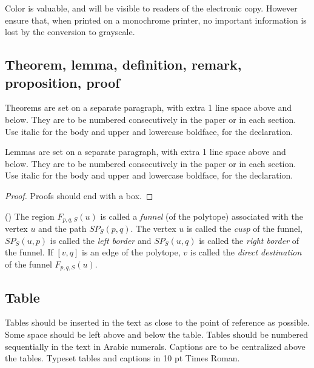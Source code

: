Color is valuable, and will be visible to readers of the electronic copy.
However ensure that, when printed on a monochrome printer, no important
information is lost by the conversion to grayscale.

\subsection{Theorem, lemma, definition, remark, proposition, proof}
\begin{theorem}
    Theorems are set on a separate paragraph, with extra 1 line space above and below. They are to be numbered consecutively in the paper or in each section. Use italic for the body and upper and lowercase boldface, for the declaration.
\end{theorem}
\begin{lemma}
    Lemmas are set on a separate paragraph, with extra 1 line space above and below. They are to be numbered consecutively in the paper or in each section. Use italic for the body and upper and lowercase boldface, for the declaration.
\end{lemma}
\begin{proof}
    Proofs should end with a box.
    \end{proof}

\begin{definition}\rm(\cite{b3})
    The region \(F_{p,q,S}(u)\) is called a \textit{funnel} (of the polytope) associated with the vertex \(u\) and the path \(SP_S(p, q)\). The vertex \(u\) is called the \textit{cusp} of the funnel, \(SP_S(u, p)\) is called the \textit{left border} and \(SP_S(u, q)\) is called the \textit{right border} of the funnel. If \([v, q]\) is an edge of the polytope, \(v\) is called the \textit{direct destination} of the funnel \(F_{p,q,S}(u)\).
\end{definition}
\subsection{Table}
Tables should be inserted in the text as close to the point of reference as possible. Some space should be left above and below the table. Tables should be numbered sequentially in the text in Arabic numerals. Captions are to be centralized above the tables. Typeset tables and captions in 10 pt Times Roman.

